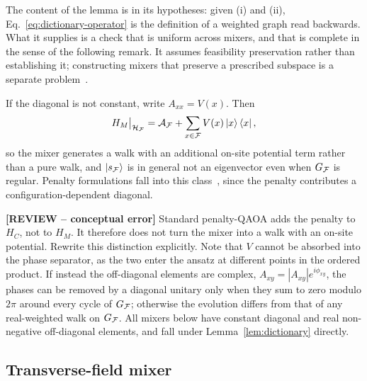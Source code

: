 The content of the lemma is in its hypotheses: given (i) and (ii), Eq.~\eqref{eq:dictionary-operator} is the definition of a weighted graph read backwards. What it supplies is a check that is uniform across mixers, and that is complete in the sense of the following remark. It assumes feasibility preservation rather than establishing it; constructing mixers that preserve a prescribed subspace is a separate problem~\cite{Fuchs2022,Fuchs2024}.

\begin{remark}  
\label{rem:failure}
If the diagonal is not constant, write $A_{xx}=V(x)$. Then
\begin{equation}
H_M\big|_{\mathcal{H}_{\mathcal{F}}} = \mathcal{A}_{\mathcal{F}}+\sum_{x\in\mathcal{F}}V(x)\ket{x}\bra{x},
    \label{eq:potential}
\end{equation}
so the mixer generates a walk with an additional on-site potential term rather than a pure walk, and $\ket{s_{\mathcal{F}}}$ is in general not an eigenvector even when $G_{\mathcal{F}}$ is regular. Penalty formulations fall into this class~\cite{Lucas2014}, since the penalty contributes a configuration-dependent diagonal.

{\color{red}\textbf{[REVIEW -- conceptual error]} Standard penalty-QAOA adds the penalty to $H_C$, not to $H_M$. It therefore does not turn the mixer into a walk with an on-site potential. Rewrite this distinction explicitly.} Note that $V$ cannot be absorbed into the phase separator, as the two enter the ansatz at different points in the ordered product. If instead the off-diagonal elements are complex, $A_{xy}=|A_{xy}|e^{i\phi_{xy}}$, the phases can be removed by a diagonal unitary only when they sum to zero modulo $2\pi$ around every cycle of $G_{\mathcal{F}}$; otherwise the evolution differs from that of any real-weighted walk on $G_{\mathcal{F}}$. All mixers below have constant diagonal and real non-negative off-diagonal elements, and fall under Lemma~\ref{lem:dictionary} directly.
\end{remark}

\subsection{\label{subsec:transverse}Transverse-field mixer}

